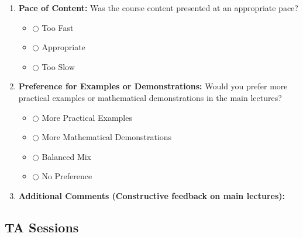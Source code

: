 \documentclass[a4paper,12pt]{article}
\begin{document}
\begin{enumerate}[label=\textbf{\arabic*.}]
    \item \textbf{Pace of Content:} Was the course content presented at an appropriate pace?
    \begin{itemize}
        \item[] $\bigcirc$ Too Fast
        \item[] $\bigcirc$ Appropriate
        \item[] $\bigcirc$ Too Slow
    \end{itemize}

    \item \textbf{Preference for Examples or Demonstrations:} Would you prefer more practical examples or mathematical demonstrations in the main lectures?
    \begin{itemize}
        \item[] $\bigcirc$ More Practical Examples
        \item[] $\bigcirc$ More Mathematical Demonstrations
        \item[] $\bigcirc$ Balanced Mix
        \item[] $\bigcirc$ No Preference
    \end{itemize}

    \item \textbf{Additional Comments (Constructive feedback on main lectures):} \\
    \hrulefill
    \vspace{3cm}

\end{enumerate}

\subsection*{TA Sessions}
\end{document}
